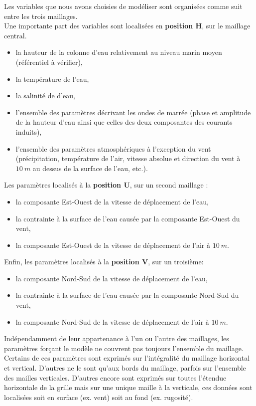 \documentclass[10pt,a4paper,titlepage]{article}
\begin{document}
Les variables que nous avons choisies de modéliser sont organisées comme suit entre les trois maillages.\\
Une importante part des variables sont localisées en \textbf{position H}, sur le maillage central.
\begin{itemize}
    \item la hauteur de la colonne d'eau relativement au niveau marin moyen (référentiel à vérifier),
    \item la température de l'eau,
    \item la salinité de d'eau,
    \item l'ensemble des paramètres décrivant les ondes de marrée (phase et amplitude de la hauteur d'eau ainsi que celles des deux composantes des courants induits),
    \item l'ensemble des paramètres atmosphériques à l'exception du vent (précipitation, température de l'air, vitesse absolue et direction du vent à $10~m$ au dessus de la surface de l'eau, etc.).
\end{itemize}
Les paramètres localisés à la \textbf{position U}, sur un second maillage :
\begin{itemize}
    \item la composante Est-Ouest de la vitesse de déplacement de l'eau,
    \item la contrainte à la surface de l'eau causée par la composante Est-Ouest du vent,
    \item la composante Est-Ouest de la vitesse de déplacement de l'air à $10~m$.
\end{itemize}
Enfin, les paramètres localisés à la \textbf{position V}, sur un troisième:
\begin{itemize}
    \item la composante Nord-Sud de la vitesse de déplacement de l'eau,
    \item la contrainte à la surface de l'eau causée par la composante Nord-Sud du vent,
    \item la composante Nord-Sud de la vitesse de déplacement de l'air à $10~m$.
\end{itemize}

Indépendamment de leur appartenance à l'un ou l'autre des maillages, les paramètres forçant le modèle ne couvrent pas toujours l'ensemble du maillage.
Certains de ces paramètres sont exprimés sur l'intégralité du maillage horizontal et vertical.
D'autres ne le sont qu'aux bords du maillage, parfois sur l'ensemble des mailles verticales.
D'autres encore sont exprimés sur toutes l'étendue horizontale de la grille mais sur une unique maille à la verticale, ces données sont localisées soit en surface (ex. vent) soit au fond (ex. rugosité).
\end{document}
